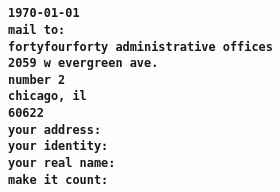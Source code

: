 \documentclass{article}
\begin{document}
\thispagestyle{empty}

\paragraph
{
\texttt
{
\\\today
\vspace{5 mm}
\\mail to:\\
fortyfourforty administrative offices\\
2059 w evergreen ave.\\
number 2\\
chicago, il\\
60622
}
\texttt
{
\vspace{5 mm}
\\your address:
\vspace{5 mm}
\\your identity:
\vspace{5 mm}
\\your real name:
\vspace{5 mm}
\\make it count:\\
}
}

\framebox{\textcolor{white}{\rule{4in}{4in}}}
\end{document}
